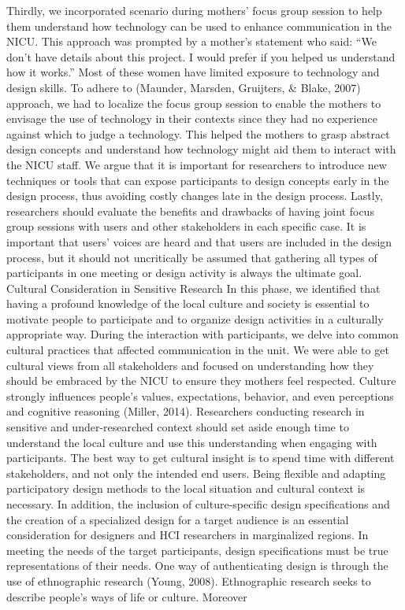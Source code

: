 Thirdly, we incorporated scenario during mothers’ focus group session to help them understand how technology can be used to enhance communication in the NICU. This approach was prompted by a mother’s statement who said:
“We don't have details about this project. I would prefer if you helped us understand how it works.”
Most of these women have limited exposure to technology and design skills. To adhere to (Maunder, Marsden, Gruijters, & Blake, 2007) approach, we had to localize the focus group session to enable the mothers to envisage the use of technology in their contexts since they had no experience against which to judge a technology. This helped the mothers to grasp abstract design concepts and understand how technology might aid them to interact with the NICU staff. We argue that it is important for researchers to introduce new techniques or tools that can expose participants to design concepts early in the design process, thus avoiding costly changes late in the design process.
Lastly, researchers should evaluate the benefits and drawbacks of having joint focus group sessions with users and other stakeholders in each specific case. It is important that users’ voices are heard and that users are included in the design process, but it should not uncritically be assumed that gathering all types of participants in one meeting or design activity is always the ultimate goal. 
Cultural Consideration in Sensitive Research
In this phase, we identified that having a profound knowledge of the local culture and society is essential to motivate people to participate and to organize design activities in a culturally appropriate way. During the interaction with participants, we delve into common cultural practices that affected communication in the unit. We were able to get cultural views from all stakeholders and focused on understanding how they should be embraced by the NICU to ensure they mothers feel respected.  Culture strongly influences people’s values, expectations, behavior, and even perceptions and cognitive reasoning (Miller, 2014). Researchers conducting research in sensitive and under-researched context should set aside enough time to understand the local culture and use this understanding when engaging with participants. The best way to get cultural insight is to spend time with different stakeholders, and not only the intended end users. Being flexible and adapting participatory design methods to the local situation and cultural context is necessary.
In addition, the inclusion of culture-specific design specifications and the creation of a specialized design for a target audience is an essential consideration for designers and HCI researchers in marginalized regions. In meeting the needs of the target participants, design specifications must be true representations of their needs. One way of authenticating design is through the use of ethnographic research (Young, 2008). Ethnographic research seeks to describe people’s ways of life or culture. Moreover
